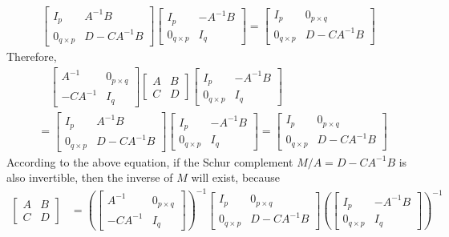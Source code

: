 \begin{align*}
\begin{bmatrix}
I_p & A^{-1}B \\
0_{q\times p} & D - CA^{-1}B 
\end{bmatrix}
\begin{bmatrix}
I_p & -A^{-1}B \\
0_{q \times p} & I_q
\end{bmatrix}
=
\begin{bmatrix}
I_p & 0_{p \times q} \\
0_{q\times p} & D - CA^{-1}B 
\end{bmatrix}
\end{align*}
Therefore,
\begin{align*}
&\quad \begin{bmatrix}
A^{-1} & 0_{p\times q} \\
-CA^{-1} & I_q
\end{bmatrix}
\begin{bmatrix}
A & B \\
C & D
\end{bmatrix}
\begin{bmatrix}
I_p & -A^{-1}B \\
0_{q \times p} & I_q
\end{bmatrix} \\
&= \begin{bmatrix}
I_p & A^{-1}B \\
0_{q\times p} & D - CA^{-1}B 
\end{bmatrix}
\begin{bmatrix}
I_p & -A^{-1}B \\
0_{q \times p} & I_q
\end{bmatrix}
=
\begin{bmatrix}
I_p & 0_{p \times q} \\
0_{q\times p} & D - CA^{-1}B 
\end{bmatrix}
\end{align*}
According to the above equation, if the Schur complement $M/A = D-CA^{-1}B$ is also invertible, then the inverse of $M$ will exist, because
\begin{align*}
\begin{bmatrix}
A & B \\
C & D
\end{bmatrix}
&= 
\left(\begin{bmatrix}
A^{-1} & 0_{p\times q} \\
-CA^{-1} & I_q
\end{bmatrix}\right)^{-1}
\begin{bmatrix}
I_p & 0_{p \times q} \\
0_{q\times p} & D - CA^{-1}B 
\end{bmatrix}
\left(\begin{bmatrix}
I_p & -A^{-1}B \\
0_{q \times p} & I_q
\end{bmatrix}\right)^{-1}
\end{align*}
